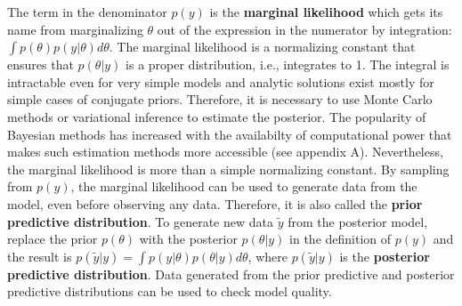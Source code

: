 The term in the denominator $p(y)$ is the \textbf{marginal likelihood} which gets its name from marginalizing $\theta$ out of the expression in the numerator by integration: $\int p(\theta) p(y|\theta)d\theta$.
The marginal likelihood is a normalizing constant that ensures that $p(\theta|y)$ is a proper distribution, i.e., integrates to 1.
The integral is intractable even for very simple models and analytic solutions exist mostly for simple cases of conjugate priors.
Therefore, it is necessary to use Monte Carlo methods or variational inference to estimate the posterior.
The popularity of Bayesian methods has increased with the availabilty of computational power that makes such estimation methods more accessible (see appendix A).
Nevertheless, the marginal likelihood is more than a simple normalizing constant.
By sampling from $p(y)$, the marginal likelihood can be used to generate data from the model, even before observing any data.
Therefore, it is also called the \textbf{prior predictive distribution}.
To generate new data  $\tilde y$ from the posterior model, replace the prior $p(\theta)$ with the posterior $p(\theta|y)$ in the definition of $p(y)$ and the result is $p(\tilde y|y) = \int p(y | \theta) p(\theta|y) d\theta$, where $p(\tilde y | y)$ is the \textbf{posterior predictive distribution}.
Data generated from the prior predictive and posterior predictive distributions can be used to check model quality.


